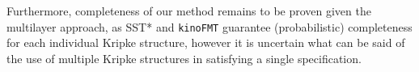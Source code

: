 Furthermore, completeness of our method remains to be proven given the multilayer approach, as SST* and \texttt{kinoFMT} guarantee (probabilistic) completeness for each individual Kripke structure, however it is uncertain what can be said of the use of multiple Kripke structures in satisfying a single specification.